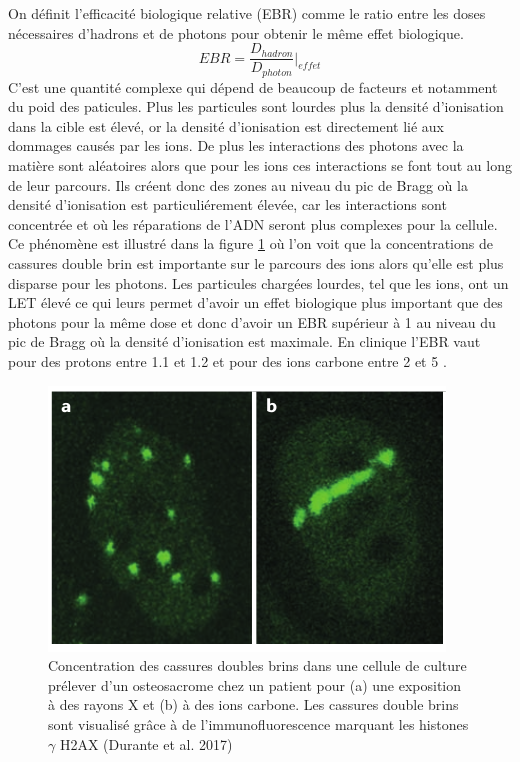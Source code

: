 \documentclass[11pt,a4paper,oldfontcommands]{memoir}
\begin{document}
On définit l'efficacité biologique relative (EBR) comme le ratio entre les doses nécessaires d'hadrons et de photons pour obtenir le même effet biologique.
$$EBR = \frac{D_{hadron}}{D_{photon}}\bigg|_{effet}$$
C'est une quantité complexe qui dépend de beaucoup de facteurs et notamment du poid des paticules. Plus les particules sont lourdes plus la densité d'ionisation dans la cible est élevé, or la densité d'ionisation est directement lié aux dommages causés par les ions. De plus les interactions des photons avec la matière sont aléatoires alors que pour les ions ces interactions se font tout au long de leur parcours. Ils créent donc des zones au niveau du pic de Bragg où la densité d'ionisation est particuliérement élevée, car les interactions sont concentrée et où les réparations de l'ADN seront plus complexes pour la cellule. Ce phénomène est illustré dans la figure \ref{LET} où l'on voit que la concentrations de cassures double brin est importante sur le parcours des ions alors qu'elle est plus disparse pour les photons. Les particules chargées lourdes, tel que les ions, ont un LET élevé ce qui leurs permet d'avoir un effet biologique plus important que des photons pour la même dose et donc d'avoir un EBR supérieur à 1 au niveau du pic de Bragg où la densité d'ionisation est maximale. En clinique l'EBR vaut  pour des protons entre 1.1 et 1.2 et pour des ions carbone entre 2 et 5 \cite{Choi}. 
\begin{figure}
    \centering
    \includegraphics[scale = 0.7]{intro/LETDSS.png}
    \caption{Concentration des cassures doubles brins dans une cellule de culture prélever d'un osteosacrome chez un patient pour (a) une exposition à des rayons X et (b) à des ions carbone. Les cassures double brins sont visualisé grâce à de l'immunofluorescence marquant les histones $ \gamma$ H2AX (Durante et al. 2017)}
    \label{LET}
\end{figure}
\end{document}
